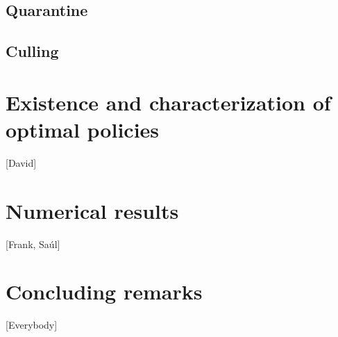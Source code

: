\documentclass[a4paper]{article}
\begin{document}
    \subsection{Quarantine}
    	
    \subsection{Culling}
    	


\section{Existence and characterization of optimal policies}
[David]

\section{Numerical results}
[Frank, Saúl]

\section{Concluding remarks}
[Everybody]



\end{document}
